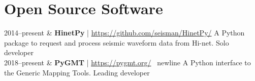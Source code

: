 \section{Open Source Software}

\begin{EntriesTable}{0.2}{0.02}{0.78}
2014--present & \textbf{HinetPy} | \url{https://github.com/seisman/HinetPy/} \newline
                A Python package to request and process seismic waveform data from Hi-net. \newline
                Solo developer \\
2018--present & \textbf{PyGMT} | \url{https://pygmt.org/} \ newline
                A Python interface to the Generic Mapping Tools. \newline
                Leading developer \\
\end{EntriesTable}
